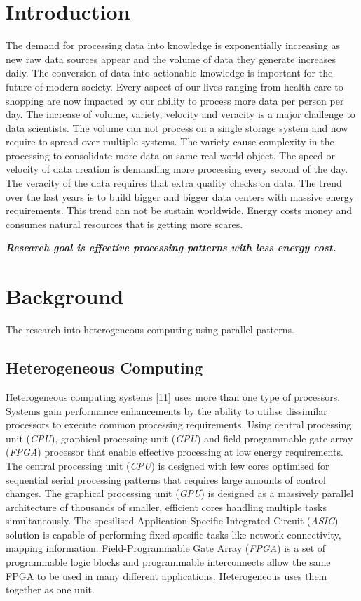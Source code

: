 \documentclass{acm_proc_article-sp}
\begin{document}
\section{Introduction}
The demand for processing data into knowledge is exponentially increasing as new raw data sources appear and the volume of data they generate increases daily. The conversion of data into actionable knowledge is important for the future of modern society. Every aspect of our lives ranging from health care to shopping are now impacted by our ability to process more data per person per day. 
The increase of volume, variety, velocity and veracity is a major challenge to data scientists.
The volume can not process on a single storage system and now require to spread over multiple systems. 
The variety cause complexity in the processing to consolidate more data on same real world object. 
The speed or velocity of data creation is demanding more processing every second of the day. 
The veracity of the data requires that extra quality checks on data.
The trend over the last years is to build bigger and bigger data centers with massive energy requirements. This trend can not be sustain worldwide. Energy costs money and consumes natural resources that is getting more scares.

\textbf{\textit{Research goal is effective processing patterns with less energy cost.}}
\section{Background}
The research into heterogeneous computing using parallel patterns.
\subsection{Heterogeneous Computing}
Heterogeneous computing systems [11] uses more than one type of processors. Systems gain performance enhancements by the ability to utilise dissimilar processors to execute common processing requirements. Using central processing unit (\textit{CPU}), graphical processing unit (\textit{GPU}) and field-programmable gate array (\textit{FPGA}) processor that enable effective processing at low energy requirements.
The central processing unit (\textit{CPU}) is designed with few cores optimised for sequential serial processing patterns that requires large amounts of control changes. The graphical processing unit (\textit{GPU}) is designed as a massively parallel architecture of thousands of smaller, efficient cores handling multiple tasks simultaneously. The spesilised Application-Specific Integrated Circuit (\textit{ASIC}) solution is capable of performing fixed spesific tasks like network connectivity, mapping information. Field-Programmable Gate Array (\textit{FPGA}) is a set of programmable logic blocks and programmable interconnects allow the same FPGA to be used in many different applications. Heterogeneous uses them together as one unit.
\end{document}
